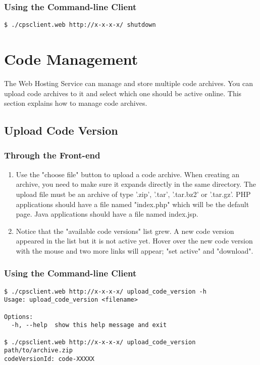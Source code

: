 \documentclass[12pt]{article}
\newenvironment{framedbox}[1]%
{\begin{framed}
 \begingroup
 \fontsize{#1}{#1}\selectfont
}
{
 \endgroup
 \end{framed}
}
\begin{document}
\subsubsection{Using the Command-line Client}
\begin{framedbox}{8pt}\begin{verbatim}
$ ./cpsclient.web http://x-x-x-x/ shutdown
\end{verbatim}\end{framedbox}

\section{Code Management}
The Web Hosting Service can manage and store multiple code archives. You can
upload code archives to it and select which one should be active online.
This section explains how to manage code archives.

\subsection{Upload Code Version}
\subsubsection{Through the Front-end}
\begin{enumerate}
\item Use the "choose file" button to upload a code archive. When creating an
      archive, you need to make sure it expands directly in the same directory.
      The upload file must be an archive of type '.zip', '.tar', '.tar.bz2' or
      '.tar.gz'. PHP applications should have a file named "index.php"
      which will be the default page. Java applications should have a file
      named index.jsp.
\item Notice that the "available code versions" list grew. A new code version
      appeared in the list but it is not active yet. Hover over the new code
      version with the mouse and two more links will appear; "set active" and
      "download".
\end{enumerate}


\subsubsection{Using the Command-line Client}
\begin{framedbox}{8pt}\begin{verbatim}
$ ./cpsclient.web http://x-x-x-x/ upload_code_version -h
Usage: upload_code_version <filename>

Options:
  -h, --help  show this help message and exit

$ ./cpsclient.web http://x-x-x-x/ upload_code_version path/to/archive.zip
codeVersionId: code-XXXXX
\end{verbatim}\end{framedbox}
\end{document}
